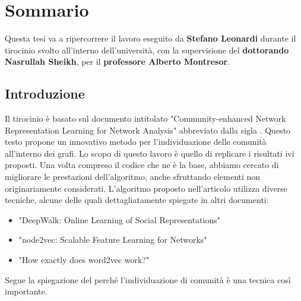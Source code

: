 %
%
%
\chapter{Sommario}\label{chap:0}
Questa tesi va a ripercorrere il lavoro eseguito da \textbf{Stefano Leonardi} durante il tirocinio svolto all'interno dell'università, con la supervisione del \textbf{dottorando Nasrullah Sheikh}, per il \textbf{professore Alberto Montresor}.
%
\section{Introduzione}
Il tirocinio è basato sul documento intitolato "Community-enhanced Network Representation Learning for Network Analysis"\cite{CNRL_paper} abbreviato dalla sigla \textbf{\cnrl}. Questo testo propone un innovativo metodo per l'individuazione delle comunità all'interno dei grafi. Lo scopo di questo lavoro è quello di replicare i risultati ivi proposti. Una volta compreso il codice che ne è la base, abbiamo cercato di migliorare le prestazioni dell'algoritmo, anche sfruttando elementi non originariamente considerati.\newline
L'algoritmo proposto nell'articolo utilizza diverse tecniche, alcune delle quali dettagliatamente spiegate in altri documenti:
\begin{itemize}
	\item "DeepWalk: Online Learning of Social Representations"\cite{DW_paper}
	\item "node2vec: Scalable Feature Learning for Networks"\cite{N2V_paper}
	\item "How exactly does word2vec work?"\cite{W2V_paper}
\end{itemize} 
Segue la spiegazione del perché l'individuazione di comunità è una tecnica così importante.
%
